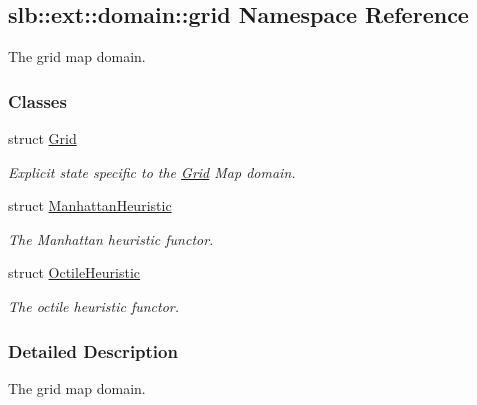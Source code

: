 \hypertarget{namespaceslb_1_1ext_1_1domain_1_1grid}{}\subsection{slb\+:\+:ext\+:\+:domain\+:\+:grid Namespace Reference}
\label{namespaceslb_1_1ext_1_1domain_1_1grid}


The grid map domain.  


\subsubsection*{Classes}
\begin{DoxyCompactItemize}
\item 
struct \hyperlink{structslb_1_1ext_1_1domain_1_1grid_1_1Grid}{Grid}
\begin{DoxyCompactList}\small\item\em Explicit state specific to the \hyperlink{structslb_1_1ext_1_1domain_1_1grid_1_1Grid}{Grid} Map domain. \end{DoxyCompactList}\item 
struct \hyperlink{structslb_1_1ext_1_1domain_1_1grid_1_1ManhattanHeuristic}{Manhattan\+Heuristic}
\begin{DoxyCompactList}\small\item\em The Manhattan heuristic functor. \end{DoxyCompactList}\item 
struct \hyperlink{structslb_1_1ext_1_1domain_1_1grid_1_1OctileHeuristic}{Octile\+Heuristic}
\begin{DoxyCompactList}\small\item\em The octile heuristic functor. \end{DoxyCompactList}\end{DoxyCompactItemize}


\subsubsection{Detailed Description}
The grid map domain. 